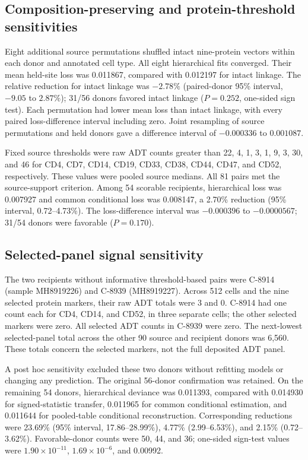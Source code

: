 \documentclass[10pt,a4paper]{article}
\begin{document}
\subsection{Composition-preserving and protein-threshold sensitivities}

Eight additional source permutations shuffled intact nine-protein vectors within
each donor and annotated cell type. All eight hierarchical fits converged.
Their mean held-site loss was 0.011867, compared with 0.012197 for intact
linkage. The relative reduction for intact linkage was $-2.78\%$
(paired-donor 95\% interval, $-9.05$ to $2.87\%$); 31/56 donors favored
intact linkage ($P=0.252$, one-sided sign test). Each permutation had lower
mean loss than intact linkage, with every paired loss-difference interval
including zero. Joint resampling of source permutations and held donors gave
a difference interval of $-0.000336$ to $0.001087$.

Fixed source thresholds were raw ADT counts greater than 22, 4, 1, 3, 1, 9, 3,
30, and 46 for CD4, CD7, CD14, CD19, CD33, CD38, CD44, CD47, and CD52,
respectively. These values were pooled source medians. All 81 pairs met the
source-support criterion. Among 54 scorable recipients, hierarchical loss
was 0.007927 and common conditional loss was 0.008147, a 2.70\% reduction
(95\% interval, 0.72--4.73\%). The loss-difference interval was
$-0.000396$ to $-0.0000567$; 31/54 donors were favorable ($P=0.170$).

\subsection{Selected-panel signal sensitivity}

The two recipients without informative threshold-based pairs were C-8914
(sample MH8919226) and C-8939 (MH8919227). Across 512 cells and the nine
selected protein markers, their raw ADT totals were 3 and 0. C-8914 had one
count each for CD4, CD14, and CD52, in three separate cells; the other
selected markers were zero. All selected ADT counts in C-8939 were zero.
The next-lowest selected-panel total across the other 90 source and recipient
donors was 6,560. These totals concern the selected markers, not the full
deposited ADT panel.

A post hoc sensitivity excluded these two donors without refitting models or
changing any prediction. The original 56-donor confirmation was retained.
On the remaining 54 donors, hierarchical deviance was 0.011393, compared with
0.014930 for signed-statistic transfer, 0.011965 for common conditional
estimation, and 0.011644 for pooled-table conditional reconstruction.
Corresponding reductions were 23.69\% (95\% interval, 17.86--28.99\%),
4.77\% (2.99--6.53\%), and 2.15\% (0.72--3.62\%). Favorable-donor
counts were 50, 44, and 36; one-sided sign-test values were
$1.90\times10^{-11}$, $1.69\times10^{-6}$, and 0.00992.
\end{document}
